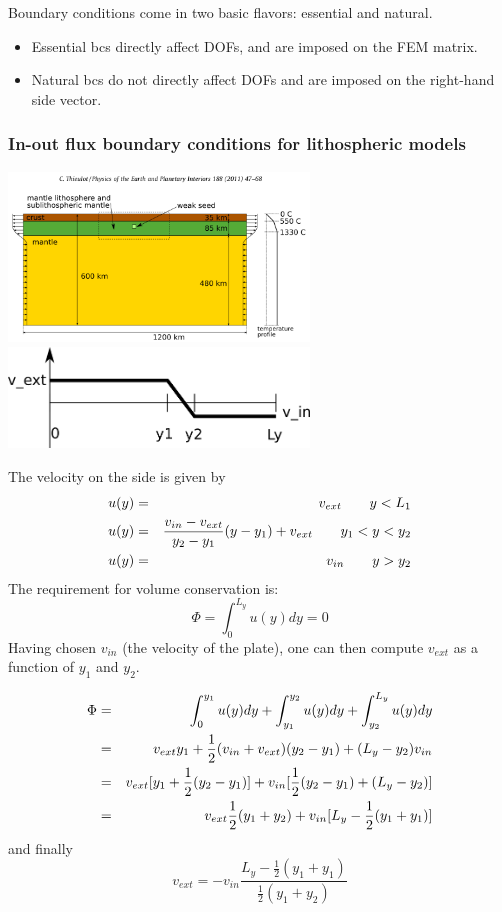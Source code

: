 
Boundary conditions come in two basic flavors: essential and natural.
\begin{itemize}
\item Essential bcs directly affect DOFs, and are imposed on the FEM matrix. 
\item Natural bcs do not directly affect DOFs and are imposed on the right-hand side vector.
\end{itemize}

\subsubsection{In-out flux boundary conditions for lithospheric models}

\begin{center}
\includegraphics[width=8cm]{images/boundary_conditions/bc1}\\
\includegraphics[width=8cm]{images/boundary_conditions/drawing.png}
\end{center}

The velocity on the side is given by
\begin{eqnarray}
u(y) &=& v_{ext} \quad\quad y<L_1 \nonumber\\
u(y) &=& \frac{v_{in}-v_{ext}}{y_2-y_1}(y-y_1) + v_{ext} \quad\quad y_1<y<y_2 \nonumber\\
u(y) &=& v_{in} \quad\quad y>y_2 \nonumber
\end{eqnarray}
The requirement for volume conservation is:
\[
\Phi=\int_{0}^{L_y} u(y) dy = 0
\]
Having chosen $v_{in}$ (the velocity of the plate), one can then compute $v_{ext}$
as a function of $y_1$ and $y_2$.

\begin{eqnarray}
\Phi
&=&\int_{0}^{y_1} u(y) dy  +\int_{y_1}^{y_2} u(y) dy +\int_{y_2}^{L_y} u(y) dy \nonumber\\
&=& v_{ext} y_1  + \frac{1}{2}(v_{in}+v_{ext})(y_2-y_1) + (L_y-y_2) v_{in} \nonumber\\
&=& v_{ext} [y_1 + \frac{1}{2}(y_2-y_1) ] + v_{in} [ \frac{1}{2}(y_2-y_1)  + (L_y-y_2) ] \nonumber\\
&=& v_{ext}\frac{1}{2} (y_1 + y_2 ) + v_{in} [ L_y - \frac{1}{2}(y_1+y_1) ] \nonumber
\end{eqnarray}
and finally
\[
v_{ext} = -v_{in} \frac{ L_y - \frac{1}{2}(y_1+y_1)}{ \frac{1}{2} (y_1 + y_2 ) }
\]
